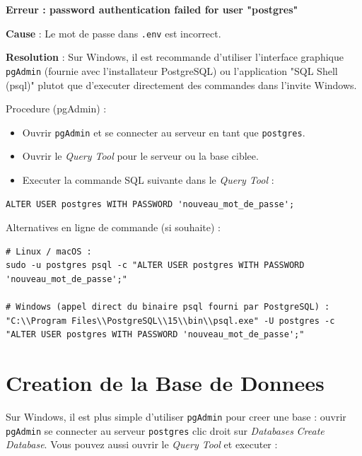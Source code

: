 \documentclass[a4paper,12pt]{book}
\begin{document}
\begin{errorbox}
    \textbf{Erreur : password authentication failed for user "postgres"}

    \textbf{Cause} : Le mot de passe dans \texttt{.env} est incorrect.

    \textbf{Resolution} :
    Sur Windows, il est recommande d'utiliser l'interface graphique \texttt{pgAdmin}
    (fournie avec l'installateur PostgreSQL) ou l'application "SQL Shell (psql)"
    plutot que d'executer directement des commandes dans l'invite Windows.

    Procedure (pgAdmin) :
    \begin{itemize}
        \item Ouvrir \texttt{pgAdmin} et se connecter au serveur en tant que \texttt{postgres}.
        \item Ouvrir le \emph{Query Tool} pour le serveur ou la base ciblee.
        \item Executer la commande SQL suivante dans le \emph{Query Tool} :
    \end{itemize}

    \begin{lstlisting}[style=sql]
ALTER USER postgres WITH PASSWORD 'nouveau_mot_de_passe';
    \end{lstlisting}

    Alternatives en ligne de commande (si souhaite) :
    \begin{lstlisting}[style=bash]
# Linux / macOS :
sudo -u postgres psql -c "ALTER USER postgres WITH PASSWORD 'nouveau_mot_de_passe';"

# Windows (appel direct du binaire psql fourni par PostgreSQL) :
"C:\\Program Files\\PostgreSQL\\15\\bin\\psql.exe" -U postgres -c "ALTER USER postgres WITH PASSWORD 'nouveau_mot_de_passe';"
    \end{lstlisting}
\end{errorbox}

\section{Creation de la Base de Donnees}
Sur Windows, il est plus simple d'utiliser \texttt{pgAdmin} pour creer une base :
ouvrir \texttt{pgAdmin} \rightarrow se connecter au serveur \texttt{postgres} \rightarrow
clic droit sur \emph{Databases} \rightarrow \emph{Create} \rightarrow \emph{Database}.
Vous pouvez aussi ouvrir le \emph{Query Tool} et executer :
\end{document}
